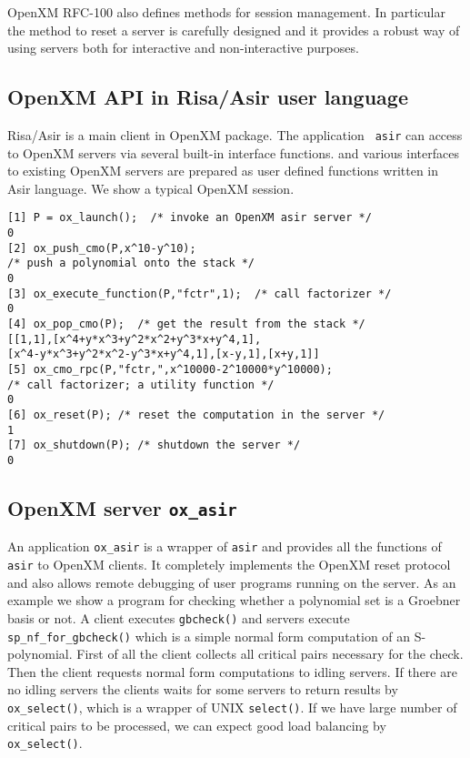 \documentclass[runningheads]{cl2emult}
\begin{document}
OpenXM RFC-100 also defines methods for session management. In particular
the method to reset a server is carefully designed and it provides
a robust way of using servers both for interactive and non-interactive
purposes. 

\subsection{OpenXM API in Risa/Asir user language}

Risa/Asir is a main client in OpenXM package.  The application {\tt
asir} can access to OpenXM servers via several built-in interface
functions. and various interfaces to existing OpenXM servers are
prepared as user defined functions written in Asir language. 
We show a typical OpenXM session.

\begin{verbatim}
[1] P = ox_launch();  /* invoke an OpenXM asir server */
0
[2] ox_push_cmo(P,x^10-y^10);
/* push a polynomial onto the stack */
0
[3] ox_execute_function(P,"fctr",1);  /* call factorizer */
0
[4] ox_pop_cmo(P);  /* get the result from the stack */
[[1,1],[x^4+y*x^3+y^2*x^2+y^3*x+y^4,1],
[x^4-y*x^3+y^2*x^2-y^3*x+y^4,1],[x-y,1],[x+y,1]]
[5] ox_cmo_rpc(P,"fctr,",x^10000-2^10000*y^10000); 
/* call factorizer; a utility function */
0
[6] ox_reset(P); /* reset the computation in the server */
1
[7] ox_shutdown(P); /* shutdown the server */
0
\end{verbatim}

\subsection{OpenXM server {\tt ox\_asir}}

An application {\tt ox\_asir} is a wrapper of {\tt asir} and provides
all the functions of {\tt asir} to OpenXM clients. It completely
implements the OpenXM reset protocol and also allows remote
debugging of user programs running on the server. As an example we
show a program for checking whether a polynomial set is a Groebner
basis or not. A client executes {\tt gbcheck()} and servers execute
{\tt sp\_nf\_for\_gbcheck()} which is a simple normal form computation
of an S-polynomial. First of all the client collects all critical pairs
necessary for the check. Then the client requests normal form
computations to idling servers. If there are no idling servers the
clients waits for some servers to return results by {\tt
ox\_select()}, which is a wrapper of UNIX {\tt select()}. If we have
large number of critical pairs to be processed, we can expect good
load balancing by {\tt ox\_select()}.
\end{document}
